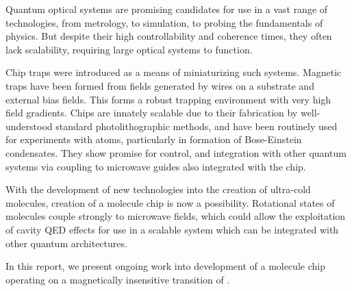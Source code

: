 Quantum optical systems are promising candidates for use in a vast range of
technologies, from metrology, to simulation, to probing the fundamentals of
physics. But despite their high controllability and coherence times, they often
lack scalability, requiring large optical systems to function.

Chip traps were introduced as a means of miniaturizing such systems. Magnetic
traps have been formed from fields generated by wires on a substrate and
external bias fields. This forms a robust trapping environment with very high
field gradients. Chips are innately scalable due to their fabrication by
well-understood standard photolithographic methods, and have been
routinely used for experiments with atoms, particularly in formation of
Bose-Einstein condensates. They show promise for control, and integration with
other quantum systems via coupling to microwave guides also integrated with the
chip.

With the development of new technologies into the creation of ultra-cold
molecules, creation of a molecule chip is now a possibility. Rotational states
of molecules couple strongly to microwave fields, which could allow the
exploitation of cavity QED effects for use in a scalable system which can be
integrated with other quantum architectures.

In this report, we present ongoing work into development of a molecule chip
operating on a magnetically insensitive transition of \CaF{}.
